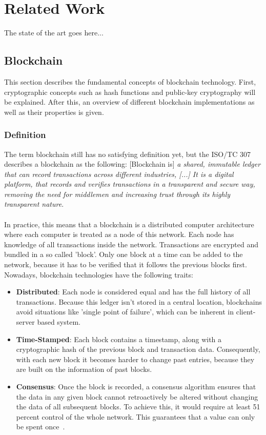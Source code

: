 \chapter{Related Work}
\label{cha:relatedwork}

The state of the art goes here...

\section{Blockchain}
This section describes the fundamental concepts of blockchain technology. First, cryptographic concepts such as hash functions and public-key cryptography will be explained. After this, an overview of different blockchain implementations as well as their properties is given. 

\subsection{Definition}
The term blockchain still has no satisfying definition yet, but the ISO/TC 307 describes a blockchain as the following:
[Blockchain is] \textit{a shared, immutable ledger that can record transactions across different industries, [...]  It is a digital platform, that records and verifies transactions in a transparent and secure way, removing the need for middlemen and increasing trust through its highly transparent nature}.
\\
\\
In practice, this means that a blockchain is a distributed computer architecture where each computer is treated as a node of this network. Each node has knowledge of all transactions inside the network. Transactions are encrypted and bundled in a so called 'block'. Only one block at a time can be added to the network, because it has to be verified that it follows the previous blocks first. Nowadays, blockchain technologies have the following traits:
\begin{itemize}
\item \textbf{Distributed}: Each node is considered equal and has the full history of all transactions.
Because this ledger isn't stored in a central location, blockchains avoid situations like 'single point of failure', which can be inherent in client-server based system.
\item \textbf{Time-Stamped}: Each block contains a timestamp, along with a cryptographic hash of the previous block and transaction data. Consequently, with each new block it becomes harder to change past entries, because they are built on the information of past blocks.
\item \textbf{Consensus}: Once the block is recorded, a consensus algorithm ensures that the data in any given block cannot retroactively be altered without changing the data of all subsequent blocks. To achieve this, it would require at least 51 percent control of the whole network. This guarantees that a value can only be spent once~\cite{Blockchain}.
\end{itemize}

